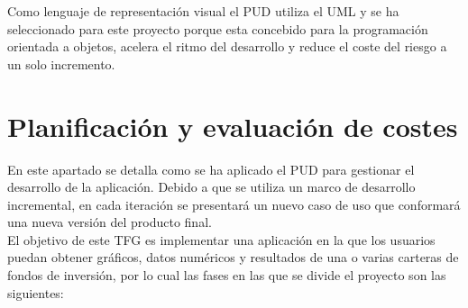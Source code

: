 \documentclass[12pt, a4paper]{article}
\begin{document}
Como lenguaje de representación visual el PUD utiliza el UML y se ha seleccionado para este proyecto porque esta concebido para la programación orientada a objetos, acelera el ritmo del desarrollo y reduce el coste del riesgo a un solo incremento.   

\part{Planificación y evaluación de costes}

En este apartado se detalla como se ha aplicado el PUD para gestionar el desarrollo de la aplicación. Debido a que se utiliza un marco de desarrollo incremental, en cada iteración se presentará un nuevo caso de uso que conformará una nueva versión del producto final.\\

El objetivo de este TFG es implementar una aplicación en la que los usuarios puedan obtener gráficos, datos numéricos y resultados de una o varias carteras de fondos de inversión, por lo cual las fases en las que se divide el proyecto son las siguientes:\\




\newpage
\end{document}
